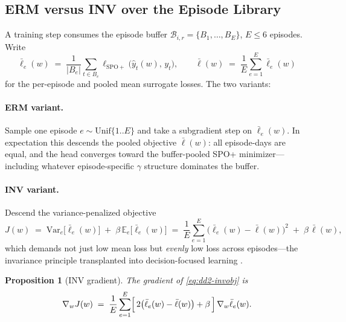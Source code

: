 \documentclass[11pt,a4paper]{article}
\theoremstyle{definition}
\theoremstyle{plain}
\newtheorem{proposition}{Proposition}[section]
\newcommand{\E}{\mathbb{E}}
\newcommand{\Var}{\mathrm{Var}}
\begin{document}
\subsection{ERM versus INV over the Episode Library}
\label{sec:dd2-erm-inv}

A training step consumes the episode buffer
$\mathcal{B}_{i,r} = \{B_1, \ldots, B_E\}$, $E \le 6$ episodes. Write
\[
\bar\ell_e(w) \;=\; \frac{1}{|B_e|} \sum_{t \in B_e}
\ell_{\mathrm{SPO+}}\bigl(\hat y_t(w),\, y_t\bigr),
\qquad
\bar\ell(w) \;=\; \frac{1}{E} \sum_{e=1}^{E} \bar\ell_e(w)
\]
for the per-episode and pooled mean surrogate losses. The two variants:

\paragraph{ERM variant.} Sample one episode $e \sim \mathrm{Unif}\{1..E\}$
and take a subgradient step on $\bar\ell_e(w)$. In expectation this descends
the pooled objective $\bar\ell(w)$: all episode-days are equal, and the head
converges toward the buffer-pooled SPO+ minimizer---including whatever
episode-specific $\gamma$ structure dominates the buffer.

\paragraph{INV variant.} Descend the variance-penalized objective
\begin{equation}
\label{eq:dd2-invobj}
J(w) \;=\; \Var_e\bigl[\bar\ell_e(w)\bigr] \;+\; \beta\, \E_e\bigl[\bar\ell_e(w)\bigr]
\;=\; \frac{1}{E} \sum_{e=1}^{E} \bigl(\bar\ell_e(w) - \bar\ell(w)\bigr)^2
\;+\; \beta\, \bar\ell(w),
\end{equation}
which demands not just low mean loss but \emph{evenly} low loss across
episodes---the invariance principle transplanted into decision-focused
learning \citep{yan2026invpnco}.

\begin{proposition}[INV gradient]
\label{prop:dd2-invgrad}
The gradient of \eqref{eq:dd2-invobj} is
\begin{equation}
\label{eq:dd2-invgrad}
\nabla_w J(w) \;=\; \frac{1}{E} \sum_{e=1}^{E}
\Bigl[\, 2\bigl(\bar\ell_e(w) - \bar\ell(w)\bigr) + \beta \,\Bigr]\,
\nabla_w \bar\ell_e(w).
\end{equation}
\end{proposition}
\end{document}
